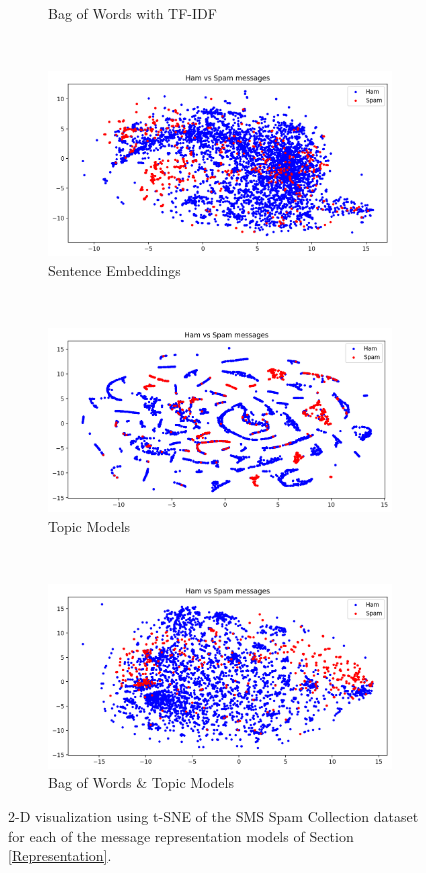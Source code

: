 \documentclass[letterpaper]{article}
\begin{document}
\begin{figure}[p]
\begin{subfigure}[t]{0.5\textwidth}
		\caption{Bag of Words with TF-IDF}
		\label{fig: tfidf}
	\end{subfigure}%
	~ 
	\begin{subfigure}[t]{0.5\textwidth}
		\centering
		\includegraphics[width = 0.95 \linewidth]{./plot_representations/sent_emb.png}
		\caption{Sentence Embeddings}
		\label{fig: sent_emb}
	\end{subfigure}
	~
	\begin{subfigure}[t]{0.5\textwidth}
		\centering
		\includegraphics[width = 0.95 \linewidth]{./plot_representations/topics.png}
		\caption{Topic Models}
		\label{fig: topics}
	\end{subfigure}%
	~ 
	\begin{subfigure}[t]{0.5\textwidth}
		\centering
		\includegraphics[width = 0.95 \linewidth]{./plot_representations/bow-topics.png}
		\caption{Bag of Words \& Topic Models}
		\label{fig: bow-topics}
	\end{subfigure}
	\caption{2-D visualization using t-SNE of the SMS Spam Collection dataset for each of the message representation models of Section \ref{Representation}.}
	\label{fig: plot_representations}
\end{figure}
\end{document}
